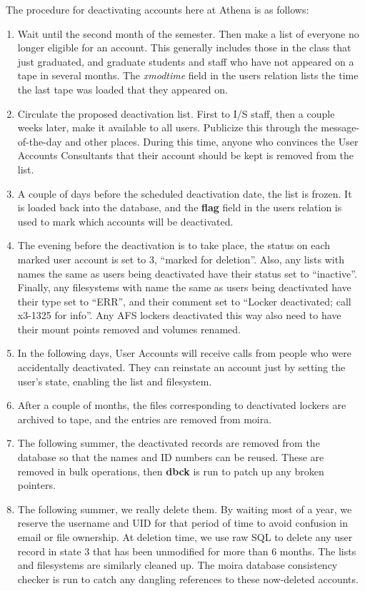 \documentclass{book}
\begin{document}
\athena\ The procedure for deactivating accounts here at Athena is as
follows:
\begin{enumerate}
\item Wait until the second month of the semester.  Then make a list
of everyone no longer eligible for an account.  This generally
includes those in the class that just graduated, and graduate students
and staff who have not appeared on a tape in several months.  The {\em
xmodtime} field in the users relation lists the time the last tape was
loaded that they appeared on.
\item Circulate the proposed deactivation list.  First to I/S staff,
then a couple weeks later, make it available to all users.  Publicize
this through the message-of-the-day and other places.  During this
time, anyone who convinces the User Accounts Consultants that their
account should be kept is removed from the list.
\item A couple of days before the scheduled deactivation date, the
list is frozen.  It is loaded back into the database, and the {\bf
flag} field in the users relation is used to mark which accounts will
be deactivated.
\item The evening before the deactivation is to take place, the status
on each marked user account is set to 3, ``marked for deletion''.
Also, any lists with names the same as users being deactivated have
their status set to ``inactive''.  Finally, any filesystems with name
the same as users being deactivated have their type set to ``ERR'',
and their comment set to ``Locker deactivated; call x3-1325 for info''.
Any AFS lockers deactivated this way also need to have their mount
points removed and volumes renamed.
\item In the following days, User Accounts will receive calls from
people who were accidentally deactivated.  They can reinstate an
account just by setting the user's state, enabling the list and
filesystem.
\item After a couple of months, the files corresponding to deactivated
lockers are archived to tape, and the entries are removed from moira.
\item The following summer, the deactivated records are removed from
the database so that the names and ID numbers can be reused.  These
are removed in bulk operations, then {\bf dbck} is run to patch up any
broken pointers.
\item The following summer, we really delete them.  By waiting most of a
year, we reserve the username and UID for that period of time to avoid
confusion in email or file ownership.  At deletion time, we use raw
SQL to delete any user record in state 3 that has been unmodified for
more than 6 months.  The lists and filesystems are similarly cleaned
up.  The moira database consistency checker is run to catch any
dangling references to these now-deleted accounts.
\end{enumerate}
\end{document}
